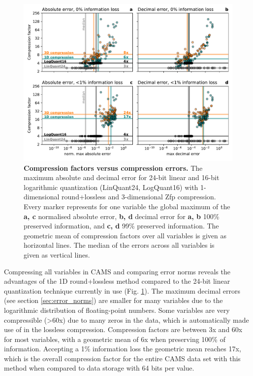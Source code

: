 \begin{figure}[tbhp]
	\includegraphics[width=1\textwidth]{Figures/compression/compression_error.pdf}
	\caption{\textbf{Compression factors versus compression errors.} The maximum absolute and decimal error
	for 24-bit linear and 16-bit logarithmic quantization (LinQuant24, LogQuant16) with 1-dimensional round+lossless
	and 3-dimensional Zfp compression. Every marker represents for one variable the global maximum of the \textbf{a, c}
	normalised absolute error, \textbf{b, d} decimal error for \textbf{a, b} 100\% preserved information, and \textbf{c, d}
	 99\% preserved information. The geometric mean of compression factors over all variables is given as horizontal lines.
	 The median of the errors across all variables is given as vertical lines.}
	\label{fig:compression_error}
\end{figure}

Compressing all variables in CAMS and comparing error norms reveals the advantages of the 1D round+lossless method
compared to the 24-bit linear quantization technique currently in use (Fig. \ref{fig:compression_error}). The maximum decimal
errors (see section \ref{sec:error_norms}) are smaller for many variables due to the logarithmic distribution of floating-point numbers.
Some variables are very compressible (>60x) due to many zeros in the data, which is automatically made use of in the lossless compression.
Compression factors are between 3x and 60x for most variables, with a geometric mean of 6x when preserving 100\% of information.
Accepting a 1\% information loss the geometric mean reaches 17x, which is the overall compression factor for the entire CAMS data
set with this method when compared to data storage with 64 bits per value.

